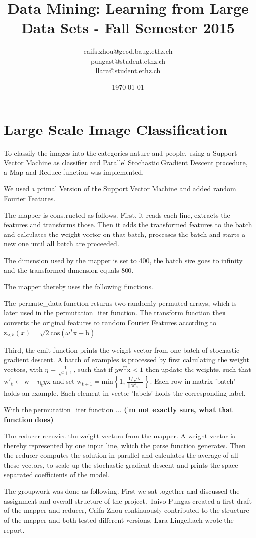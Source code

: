 \documentclass[a4paper, 11pt]{article}
\title{Data Mining: Learning from Large Data Sets - Fall Semester 2015}
\author{caifa.zhou@geod.baug.ethz.ch\\ pungast@student.ethz.ch\\ llara@student.ethz.ch\\}
\date{\today}
\begin{document}
\maketitle

\section*{Large Scale Image Classification} 
To classify the images into the categories nature and people, using a Support Vector Machine as classifier and Parallel Stochastic Gradient Descent procedure, a Map and Reduce function was implemented. 

We used a primal  Version of the Support Vector Machine and added random Fourier Features.

The mapper is constructed as follows. First, it reads each line, extracts the features and transforms those. Then it adds the transformed features to the batch and calculates the weight vector on that batch, processes the batch and starts a new one until all batch are proceeded. 

The dimension used by the mapper is set to 400, the batch size goes to infinity and the transformed dimension equals 800. 

The mapper thereby uses the following functions. 

The permute\_data function returns two randomly permuted arrays, which is later used in the permutation\_iter function. The transform function then converts the original features to random Fourier Features according to $\mathrm{z}_{\omega, b}\left ( x \right ) = \mathrm{\sqrt{2}} {\mathrm{cos}\left ( \omega ^{T}\mathrm{x + b} \right )}$.

Third, the emit function prints the weight vector from one batch of stochastic gradient descent. A batch of examples is processed by first calculating the weight vectors, with $\eta = \frac{1}{\sqrt{t +1}}$, such that if $y\mathrm{w^{T}x} < 1$ then update the weights, such that $\mathrm{w'_{t}} \leftarrow\mathrm{w + \eta _{t}}y \mathrm{x}$ and set $\mathrm{w_{t+1}} = \mathrm{min \left \{1,\frac{1/\sqrt{\lambda }}{\left \| w'_{t} \right \|} \right \}}$. Each row in matrix 'batch' holds an example. Each element in vector 'labels' holds the corresponding label.

With the permutation\_iter function  ... \textbf{(im not exactly sure, what that function does)}

The reducer recevies the weight vectors from the mapper. A weight vector is thereby represented by one input line, which the parse function generates. Then the reducer computes the solution in parallel and calculates the average of all these vectors, to scale up the stochastic gradient descent and prints the space-separated coefficients of the model.

The groupwork was done as following. First we sat together and discussed the assignment and overall structure of the project. Taivo Pungas created a first draft of the mapper and reducer, Caifa Zhou continuously contributed to the structure of the mapper and both tested different versions. Lara Lingelbach wrote the report. 
\end{document}
